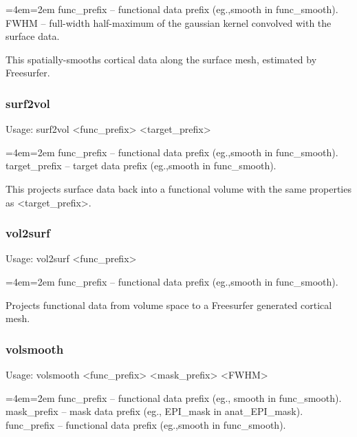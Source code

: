 \documentclass[final,titlepage,letterpaper,oneside,12pt]{article}
\renewcommand{\texttt}[2][BrickRed]{\textcolor{#1}{\ttfamily #2}}%
\newenvironment{blockquote}{%
  \par%
  \medskip
  \leftskip=4em\rightskip=2em%
  \noindent\ignorespaces}{%
  \par\medskip}
\begin{document}
\begin{blockquote}
func\_prefix -- functional data prefix (eg.,smooth in func\_smooth). \\
FWHM -- full-width half-maximum of the gaussian kernel convolved with the surface data. \
\end{blockquote}

\noindent This spatially-smooths cortical data along the surface mesh, estimated by Freesurfer.

\subsubsection{surf2vol}
Usage: \texttt{surf2vol <func\_prefix> <target\_prefix>}

\begin{blockquote}
func\_prefix -- functional data prefix (eg.,smooth in func\_smooth). \\
target\_prefix -- target data prefix (eg.,smooth in func\_smooth). \
\end{blockquote}

\noindent This projects surface data back into a functional volume with the same properties as <target\_prefix>.

\subsubsection{vol2surf}
Usage: \texttt{vol2surf <func\_prefix>}

\begin{blockquote}
func\_prefix -- functional data prefix (eg.,smooth in func\_smooth).
\end{blockquote}

\noindent Projects functional data from volume space to a Freesurfer generated cortical mesh.

\subsubsection{volsmooth}
Usage: \texttt{volsmooth <func\_prefix> <mask\_prefix> <FWHM>}

\begin{blockquote}
func\_prefix -- functional data prefix (eg., smooth in func\_smooth).
mask\_prefix -- mask data prefix (eg., EPI\_mask in anat\_EPI\_mask).
func\_prefix -- functional data prefix (eg.,smooth in func\_smooth).
\end{blockquote}
\end{document}
